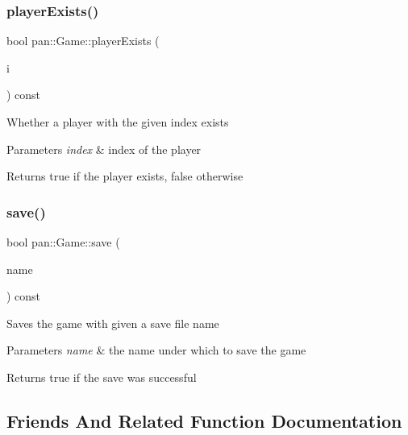 \subsubsection{\texorpdfstring{player\+Exists()}{playerExists()}}
{\footnotesize\ttfamily bool pan\+::\+Game\+::player\+Exists (\begin{DoxyParamCaption}\item[{\hyperlink{namespacepan_a0cdabf874fbf1bb3a1f0152d108c2909}{Player\+Index}}]{i }\end{DoxyParamCaption}) const\hspace{0.3cm}{\ttfamily [inline]}}

Whether a player with the given index exists 
\begin{DoxyParams}{Parameters}
{\em index} & index of the player \\
\hline
\end{DoxyParams}
\begin{DoxyReturn}{Returns}
true if the player exists, false otherwise 
\end{DoxyReturn}
\mbox{\label{classpan_1_1_game_a3ed8021afce3a331ede74826bf9742b6}} 
\subsubsection{\texorpdfstring{save()}{save()}}
{\footnotesize\ttfamily bool pan\+::\+Game\+::save (\begin{DoxyParamCaption}\item[{const std\+::string \&}]{name }\end{DoxyParamCaption}) const}

Saves the game with given a save file name 
\begin{DoxyParams}{Parameters}
{\em name} & the name under which to save the game \\
\hline
\end{DoxyParams}
\begin{DoxyReturn}{Returns}
true if the save was successful 
\end{DoxyReturn}


\subsection{Friends And Related Function Documentation}
\mbox{\label{classpan_1_1_game_a97e74bf016dcec05afd5626a1f2df25a}} 
